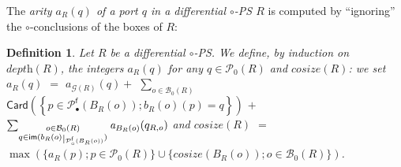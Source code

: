 \documentclass{article}
\newcommand{\target}[1]{t_{#1}}
\theoremstyle{plain}
\newtheorem{definition}{Definition}
\newcommand{\leftwires}[1]{\mathcal{L}(#1)}
\newcommand{\groundof}[1]{\mathcal{G}(#1)}
\newcommand{\cosize}[1]{\textit{cosize}(#1)}
\newcommand{\depthof}[1]{\textit{depth}(#1)}
\def\restriction#1#2{\mathchoice
              {\setbox1\hbox{${\displaystyle #1}_{\scriptstyle #2}$}
              \restrictionaux{#1}{#2}}
              {\setbox1\hbox{${\textstyle #1}_{\scriptstyle #2}$}
              \restrictionaux{#1}{#2}}
              {\setbox1\hbox{${\scriptstyle #1}_{\scriptscriptstyle #2}$}
              \restrictionaux{#1}{#2}}
              {\setbox1\hbox{${\scriptscriptstyle #1}_{\scriptscriptstyle #2}$}
              \restrictionaux{#1}{#2}}}
\def\restrictionaux#1#2{{#1\,\smash{\vrule height .8\ht1 depth .85\dp1}}_{\,#2}}
\newcommand{\im}[1]{\textsf{im}(#1)}
\newcommand{\portsatzero}[1]{\mathcal{P}_0(#1)}
\newcommand{\wiresatzero}[1]{\mathcal{W}_0(#1)}
\newcommand{\arity}[1]{{\textit{a}}_{#1}}
\newcommand{\ports}[1]{\mathcal{P}(#1)}
\newcommand{\conclusions}[1]{\mathcal{P}^{\textsf{f}}(#1)}
\newcommand{\axioms}[1]{\mathcal{A}(#1)}
\newcommand{\Card}[1]{\textsf{Card}\left( #1 \right)}
\newcommand{\conclusionscirc}[1]{\mathcal{P}_\circ^{\textsf{f}}(#1)}
\newcommand{\conclusionsnotcirc}[1]{\mathcal{P}_\bullet^{\textsf{f}}(#1)}
\newcommand{\boxesatzero}[1]{\mathcal{B}_{0}(#1)}
\newcommand{\exponentialports}[1]{\mathcal{P}^{\textit{e}}(#1)}
\newcommand{\wires}[1]{\mathcal{W}(#1)}
\begin{document}
\begin{comment}
\begin{definition}
Let $R$ be a PS of depth $d$. Let $\mathcal{G}$ be a ground-structure such that 
\begin{itemize}
\item $\ports{\mathcal{G}} = \exponentialports{\mathcal{G}}$
\item $\wires{\mathcal{G}} = \emptyset$
\item $\ports{\mathcal{G}} \cap \portsatzero{R} = \emptyset$
\end{itemize}
Let $b$ be a surjection $\conclusions{R} \to \portsatzero{R}$. Then we define a differential $\circ$-PS $R[b]$ of depth $d$ as follows:
\begin{itemize}
\item $\portsatzero{R[b]} = (\portsatzero{R} \setminus \conclusionscirc{R}) \cup \ports{\mathcal{G}}$
\item $\wiresatzero{R[b]} = \portsatzero{R} \setminus \conclusionscirc{R}$
 \item $\axioms{\groundof{R[b]}} = \axioms{\groundof{R}}$
\item $\target{\groundof{R[b]}}(q) = 
\left\lbrace \begin{array}{ll} 
\target{\groundof{R}}(q) & \textit{if $q \in \wiresatzero{R}$;}\\ b(q) & \textit{if $q \in \conclusionsnotcirc{R}$;}
\end{array} \right.$
\item $\leftwires{\groundof{R[b]}} = \leftwires{\groundof{R}}$
\item $\boxesatzero{R[b]} = \boxesatzero{R}$
\item $B_{R[b]} = B_R$
\item $b_{R[b]}(o)(q) = \left\lbrace \begin{array}{ll} 
b_R(o)(q) & \textit{if $b_R(o)(q) \notin \conclusionscirc{R}$;}\\
b(b_R(o)(q)) & \textit{if $b_R(o)(q) \in \conclusionscirc{R}$.}
\end{array} \right.$
\end{itemize}
\end{definition}
\end{comment}




The \emph{arity $\arity{R}(q)$ of a port $q$ in a differential $\circ$-PS $R$} is computed  by ``ignoring'' the $\circ$-conclusions of the boxes of $R$:

\begin{definition}
Let $R$ be a differential $\circ$-PS. We define, by induction on $\depthof{R}$, the integers $\arity{R}(q)$ for any $q \in \portsatzero{R}$ and $\cosize{R}$: we set 
$\arity{R}(q) $ $=$ $\arity{\groundof{R}}(q) +$ $\sum_{o \in \boxesatzero{R}}$ $\Card{\left\lbrace p \in \conclusionsnotcirc{B_R(o)} ; b_{R}(o)(p) = q  \right\rbrace}$ $+$ $\sum_{\substack{o \in \boxesatzero{R}\\ q \in \im{\restriction{b_R(o)}{\conclusionscirc{B_R(o)}}}}} \arity{B_R(o)}(q_{R, o})$ and 
$\cosize{R}$ $=$ $\max(\{ \arity{R}(p) ; p \in \portsatzero{R} \} \cup \{ \cosize{B_R(o)} ; o \in \boxesatzero{R} \})$.
\end{definition}
\end{document}
